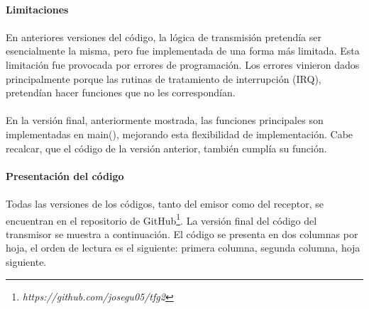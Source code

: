 \paragraph{Limitaciones}
\paragraph{}
En anteriores versiones del c\'odigo, la l\'ogica de transmisi\'on pretendía ser esencialmente la misma, pero fue implementada de una forma más limitada. Esta limitación fue provocada por errores de programación. Los errores vinieron dados principalmente porque las rutinas de tratamiento de interrupción (IRQ), pretendían hacer funciones que no les correspondían.
\paragraph{}
En la versión final, anteriormente mostrada, las funciones principales son implementadas en main(), mejorando esta flexibilidad de implementación. Cabe recalcar, que el código de la versión anterior, también cumplía su función.
\paragraph{Presentaci\'on del c\'odigo}
\paragraph{}
Todas las versiones de los c\'odigos, tanto del emisor como del receptor, se encuentran en el repositorio de GitHub\footnote{\textit{https://github.com/josegu05/tfg2}}. La versi\'on final del c\'odigo del transmisor se muestra a continuaci\'on. El c\'odigo se presenta en dos columnas por hoja, el orden de lectura es el siguiente: primera columna, segunda columna, hoja siguiente.

\begin{multicols}{2}

\end{multicols}

